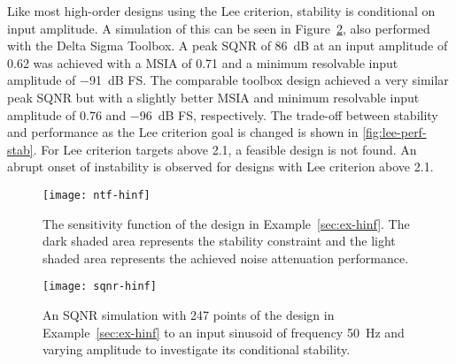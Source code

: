 Like most high-order designs using the Lee criterion, stability is conditional on input amplitude. A simulation of this can be seen in Figure~\ref{fig:sqnr-hinf}, also performed with the Delta Sigma Toolbox. A peak \gls{SQNR} of \SI{86}{\deci\bel} at an input amplitude of 0.62 was achieved with a \gls{MSIA} of 0.71 and a minimum resolvable input amplitude of \SI{-91}{\deci\bel} \gls{FS}. The comparable toolbox design achieved a very similar peak \gls{SQNR} but with a slightly better \gls{MSIA} and minimum resolvable input amplitude of 0.76 and \SI{-96}{\deci\bel} \gls{FS}, respectively. The trade-off between stability and performance as the Lee criterion goal is changed is shown in \autoref{fig:lee-perf-stab}. For Lee criterion targets above 2.1, a feasible design is not found. An abrupt onset of instability is observed for designs with Lee criterion above 2.1.

\begin{figure}
	\texttt{[image: ntf-hinf]}
	\centering
	\caption{The sensitivity function of the design in Example~\ref{sec:ex-hinf}. The dark shaded area represents the stability constraint and the light shaded area represents the achieved noise attenuation performance.} \label{fig:ntf-hinf}
\end{figure}

\begin{figure}
	\texttt{[image: sqnr-hinf]}
	\centering
	\caption{An SQNR simulation with 247 points of the design in Example~\ref{sec:ex-hinf} to an input sinusoid of frequency \SI{50}{\hertz} and varying amplitude to investigate its conditional stability.} \label{fig:sqnr-hinf}
\end{figure}

